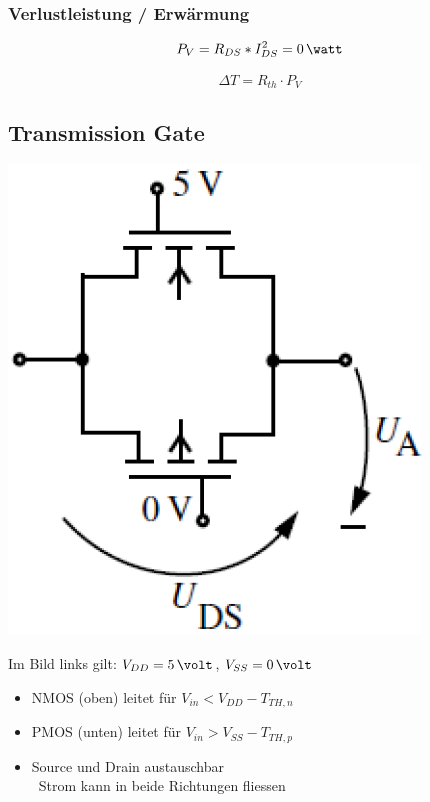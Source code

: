 \subsubsection{Verlustleistung / Erwärmung}

\begin{minipage}[c]{0.48\columnwidth}
    $$ P_V = R_{DS} * I_{DS}^2 = 0 \, \watt $$
\end{minipage}
\hfill
\begin{minipage}[c]{0.48\columnwidth}
    $$ \Delta T = R_{th} \cdot P_V $$
\end{minipage}


\subsection{Transmission Gate}

\begin{minipage}[c]{0.22\columnwidth}
    \includegraphics[width=\columnwidth]{images/transmission_gate.png}
\end{minipage}
\hfill
\begin{minipage}[c]{0.68\columnwidth}
    Im Bild links gilt: $V_{DD} = 5 \, \volt$, $V_{SS} = 0 \, \volt$ 

    \begin{itemize}
        \item NMOS (oben) leitet für $V_{in} < V_{DD} - T_{TH,n}$
        \item PMOS (unten) leitet für $V_{in} > V_{SS} - T_{TH,p}$
        \item Source und Drain austauschbar \\
            \textrightarrow\ Strom kann in beide Richtungen fliessen
    \end{itemize}
\end{minipage}